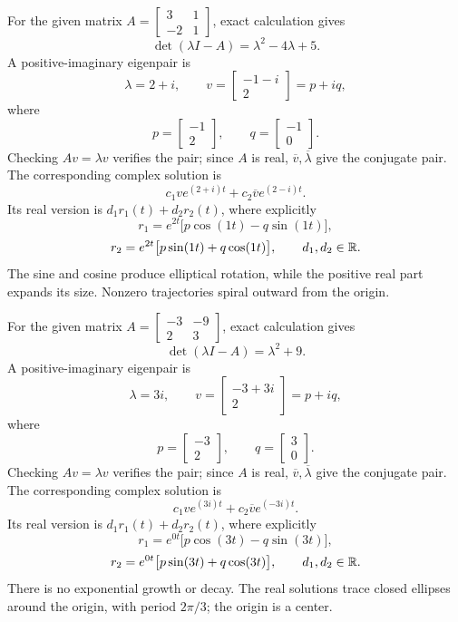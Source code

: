 For the given matrix $A=\left[\begin{matrix}3 & 1\\-2 & 1\end{matrix}\right]$, exact calculation gives
\[\det(\lambda I-A)=\lambda^{2} - 4 \lambda + 5.\]
A positive-imaginary eigenpair is
\[\lambda=2 + i,\qquad v=\left[\begin{matrix}-1 - i\\2\end{matrix}\right]=p+iq,\]
where
\[p=\left[\begin{matrix}-1\\2\end{matrix}\right],\qquad q=\left[\begin{matrix}-1\\0\end{matrix}\right].\]
Checking $Av=\lambda v$ verifies the pair; since $A$ is real,
$\overline v,\overline\lambda$ give the conjugate pair.
The corresponding complex solution is
\[c_1ve^{(2 + i)t}+c_2\overline v e^{(2 - i)t}.
\]
Its real version is $d_1r_1(t)+d_2r_2(t)$, where explicitly
\[r_1=e^{2t}\bigl[p\cos(1t)-q\sin(1t)\bigr],\]
\[r_2=e^{2t}\bigl[p\sin(1t)+q\cos(1t)\bigr],\qquad d_1,d_2\in\mathbb{R}.\]
The sine and cosine produce elliptical rotation, while the positive
real part expands its size. Nonzero trajectories spiral outward from
the origin.

For the given matrix $A=\left[\begin{matrix}-3 & -9\\2 & 3\end{matrix}\right]$, exact calculation gives
\[\det(\lambda I-A)=\lambda^{2} + 9.\]
A positive-imaginary eigenpair is
\[\lambda=3 i,\qquad v=\left[\begin{matrix}-3 + 3 i\\2\end{matrix}\right]=p+iq,\]
where
\[p=\left[\begin{matrix}-3\\2\end{matrix}\right],\qquad q=\left[\begin{matrix}3\\0\end{matrix}\right].\]
Checking $Av=\lambda v$ verifies the pair; since $A$ is real,
$\overline v,\overline\lambda$ give the conjugate pair.
The corresponding complex solution is
\[c_1ve^{(3 i)t}+c_2\overline v e^{(- 3 i)t}.
\]
Its real version is $d_1r_1(t)+d_2r_2(t)$, where explicitly
\[r_1=e^{0t}\bigl[p\cos(3t)-q\sin(3t)\bigr],\]
\[r_2=e^{0t}\bigl[p\sin(3t)+q\cos(3t)\bigr],\qquad d_1,d_2\in\mathbb{R}.\]
There is no exponential growth or decay. The real solutions trace
closed ellipses around the origin, with period $2\pi/3$;
the origin is a center.

